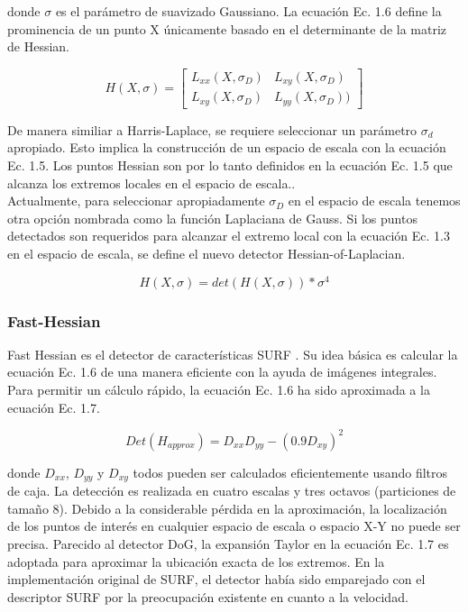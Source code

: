 donde $\sigma$ es el parámetro de suavizado Gaussiano. La ecuación Ec. 1.6 define la prominencia de un punto X únicamente basado en el determinante de la matriz de Hessian. 

\[
H(X, \sigma) = \begin{bmatrix}
 L_{xx}(X, \sigma_{D}) &  L_{xy}(X, \sigma_{D})  \\ 
 L_{xy}(X, \sigma_{D})  &  L_{yy}(X, \sigma_{D}))
\end{bmatrix}
\]

De manera similiar a Harris-Laplace, se requiere seleccionar un parámetro $\sigma_{d}$ apropiado. Esto implica la construcción de un espacio de escala con la ecuación Ec. 1.5. Los puntos Hessian son por lo tanto definidos en la ecuación Ec. 1.5 que alcanza los extremos locales en el espacio de escala.. \\

Actualmente, para seleccionar apropiadamente $\sigma_{D}$ en el espacio de escala tenemos otra opción nombrada como la función Laplaciana de Gauss. Si los puntos detectados son requeridos para alcanzar el extremo local con la ecuación Ec. 1.3 en el espacio de escala, se define el nuevo detector Hessian-of-Laplacian. 

\[
H(X,\sigma) = det(H(X,\sigma))  *  \sigma^{4}
\]

\begin{table}[htbp]
\begin{center}
\end{center}
\end{table}

\begin{table}[htbp]
\begin{center}
\end{center}
\end{table}

\subsubsection{Fast-Hessian}
Fast Hessian es el detector de características SURF \cite{Reference27}. Su idea básica es calcular la ecuación Ec. 1.6 de una manera eficiente con la ayuda de imágenes integrales. Para permitir un cálculo rápido, la ecuación Ec. 1.6 ha sido aproximada a la ecuación Ec. 1.7.

\[
Det(H_{approx}) = D_{xx}D_{yy} - (0.9D_{xy})^{2}
\]

donde $D_{xx}$, $D_{yy}$ y $D_{xy}$ todos pueden ser calculados eficientemente usando filtros de caja. La detección es realizada en cuatro escalas y tres octavos (particiones de tamaño 8). Debido a la considerable pérdida en la aproximación, la localización de los puntos de interés en cualquier espacio de escala o espacio X-Y no puede ser precisa. Parecido al detector DoG, la expansión Taylor en la ecuación Ec. 1.7 es adoptada para aproximar la ubicación exacta de los extremos. En la implementación original de SURF, el detector había sido emparejado con el descriptor SURF por la preocupación existente en cuanto a la velocidad. \\


